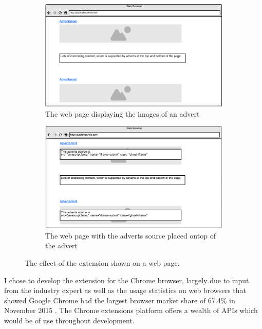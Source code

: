 \documentclass[12pt]{article}
\begin{document}
\begin{figure}[H]
    \begin{subfigure}{0.3\textwidth}
        \includegraphics[scale=0.25]{siteWithAds.png}
        \caption{The web page displaying the images of an advert}
        \label{fig:siteWithAds}
    \end{subfigure} \hspace{0.2\textwidth}
    \begin{subfigure}{0.3\textwidth}
        \includegraphics[scale=0.25]{siteWithAdSource.png}
        \caption{The web page with the adverts source placed ontop of the advert}
        \label{fig:siteWithAdSource}
    \end{subfigure}
    \caption{The effect of the extension shown on a web page.}
    \label{fig:mockup}
\end{figure}

I chose to develop the extension for the Chrome browser, largely due to input from the industry expert as well as the usage statistics on web browsers that showed Google Chrome had the largest browser market share of 67.4\% in November 2015 \parencite{browserStats}. The Chrome extensions platform offers a wealth of APIs which would be of use throughout development. \\
\end{document}
